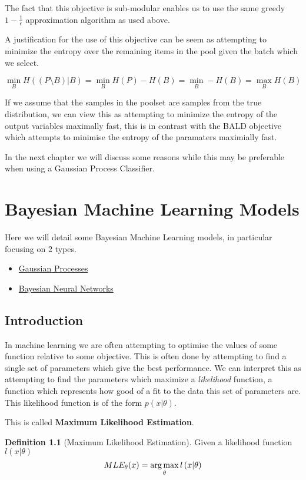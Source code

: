 \documentclass[12pt, a4paper]{report}
\theoremstyle{definition}
\theoremstyle{definition}
\newtheorem{definition}{Definition}[section]
\theoremstyle{definition}
\begin{document}
The fact that this objective is sub-modular enables us to use the same greedy $1 - \frac{1}{\epsilon}$ approximation algorithm as used above.

A justification for the use of this objective can be seem as attempting to minimize the entropy over the remaining items in the pool given the batch which we select.


$$\min_{B} H( \left(P \setminus B\right) | B) = \min_{B} H(P) - H(B) = \min_{B} - H(B) = \max_B H(B)$$

If we assume that the samples in the poolset are samples from the true distribution, we can view this as attempting to minimize the entropy of the output variables maximally fast, this is in contrast with the BALD objective which attempts to minimise the entropy of the paramaters maximially fast.

In the next chapter we will discuss some reasons while this may be preferable when using a Gaussian Process Classifier.

\chapter{Bayesian Machine Learning Models}

Here we will detail some Bayesian Machine Learning models, in particular focusing on 2 types.

\begin{itemize}
    \item \hyperref[sec:GaussianProcesses]{Gaussian Processes}
    \item \hyperref[sec:BNNs]{Bayesian Neural Networks}
\end{itemize}


\section{Introduction}

In machine learning we are often attempting to optimise the values of some function relative to some objective. This is often done by attempting to find a single set of parameters which give the best performance. We can interpret this as attempting to find the parameters which maximize a \textit{likelihood} function, a function which represents how good of a fit to the data this set of parameters are. This likelihood function is of the form $p(x | \theta)$.


This is called \textbf{Maximum Likelihood Estimation}.

\begin{definition}[Maximum Likelihood Estimation]
    Given a likelihood function $l(x | \theta)$
$$MLE_{\theta}(x) = \operatorname*{arg\,max}_{\theta} l\left(x | \theta\right)$$
\end{definition}
\end{document}
